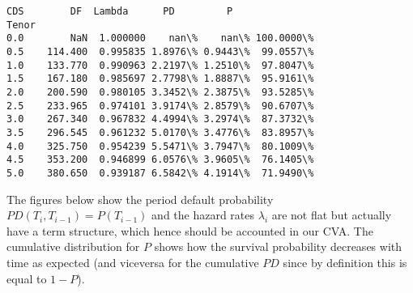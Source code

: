 \documentclass{article}
\begin{document}
    \begin{Verbatim}[commandchars=\\\{\}]
CDS        DF  Lambda      PD         P
Tenor                                             
0.0        NaN  1.000000    nan\%    nan\% 100.0000\%
0.5    114.400  0.995835 1.8976\% 0.9443\%  99.0557\%
1.0    133.770  0.990963 2.2197\% 1.2510\%  97.8047\%
1.5    167.180  0.985697 2.7798\% 1.8887\%  95.9161\%
2.0    200.590  0.980105 3.3452\% 2.3875\%  93.5285\%
2.5    233.965  0.974101 3.9174\% 2.8579\%  90.6707\%
3.0    267.340  0.967832 4.4994\% 3.2974\%  87.3732\%
3.5    296.545  0.961232 5.0170\% 3.4776\%  83.8957\%
4.0    325.750  0.954239 5.5471\% 3.7947\%  80.1009\%
4.5    353.200  0.946899 6.0576\% 3.9605\%  76.1405\%
5.0    380.650  0.939187 6.5842\% 4.1914\%  71.9490\%
    \end{Verbatim}

    The figures below show the period default probability
\(PD(T_i, T_{i-1}) = P(T_{i-1})\) and the hazard rates \(\lambda_i\) are
not flat but actually have a term structure, which hence should be
accounted in our CVA. The cumulative distribution for \(P\) shows how
the survival probability decreases with time as expected (and viceversa
for the cumulative \(PD\) since by definition this is equal to
\(1 - P\)).
\end{document}
